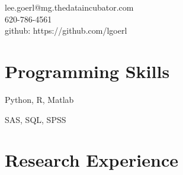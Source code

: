 \documentclass[a4paper,10pt,notitlepage]{article}
\begin{document}
\begin{multicols}{2}{
\noindent %

\noindent lee.goerl@mg.thedataincubator.com\\
620-786-4561\\
github: https://github.com/lgoerl
}
\end{multicols}
\vspace{-10pt}\section*{Programming Skills}
	\begin{description} \vspace{-5pt} \item[Experienced:] Python, R, Matlab \item[Basic:] SAS, SQL, SPSS \end{description} 


\section*{Research Experience}
\end{document}

